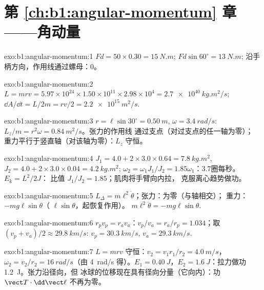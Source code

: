 \section*{第 \ref{ch:b1:angular-momentum} 章——角动量}

\begin{solution}{exo:b1:angular-momentum:1}
$Fd = 50 \times 0.30 = \qty{15}{N.m}$; $Fd\sin 60^\circ = \qty{13}{N.m}$;
沿手柄方向，作用线通过螺母：$0$。
\end{solution}

\begin{solution}{exo:b1:angular-momentum:2}
$L = mrv = 5.97\times10^{24} \times 1.50\times10^{11} \times 2.98\times10^4 =
\qty{2.7e40}{kg.m^2/s}$; $\dd A/\dd t = L/2m = rv/2 = \qty{2.2e15}{m^2/s}$.
\end{solution}

\begin{solution}{exo:b1:angular-momentum:3}
$r = \ell\sin 30^\circ = \qty{0.50}{m}$, $\omega = \qty{3.4}{rad/s}$:
$L_z/m = r^2\omega = \qty{0.84}{m^2/s}$。张力的作用线
通过支点（对过支点的任一轴为零）；
重力平行于竖直轴（对该轴为零）：$L_z$
守恒。
\end{solution}

\begin{solution}{exo:b1:angular-momentum:4}
$J_1 = 4.0 + 2 \times 3.0 \times 0.64 = \qty{7.8}{kg.m^2}$, $J_2 = 4.0 +
2 \times 3.0 \times 0.04 = \qty{4.2}{kg.m^2}$; $\omega_2 = \omega_1J_1/J_2 =
1.85\omega_1$：\qty{3.7}{}圈每秒。$E_k = L^2/2J$：
比值 $J_1/J_2 = 1.85$；肌肉将手臂向内拉，
克服离心趋势做功。
\end{solution}

\begin{solution}{exo:b1:angular-momentum:5}
$L_\Delta = m\ell^2\dot\theta$；张力：为零（与轴相交）；
重力：$-mg\ell\sin\theta$（ $\ell\sin\theta$，起恢复作用）。
$m\ell^2\ddot\theta = -mg\ell\sin\theta$.
\end{solution}

\begin{solution}{exo:b1:angular-momentum:6}
$r_pv_p = r_av_a$：$v_p/v_a = r_a/r_p = 1.034$；取 $(v_p + v_a)/2 \approx
\qty{29.8}{km/s}$: $v_p = \qty{30.3}{km/s}$, $v_a = \qty{29.3}{km/s}$.
\end{solution}

\begin{solution}{exo:b1:angular-momentum:7}
$L = mrv$ 守恒：$v_2 = v_1r_1/r_2 = \qty{4.0}{m/s}$，$\omega_2 = v_2/r_2
= \qty{16}{rad/s}$（由 \qty{4}{rad/s} 得）。$E_1 = \qty{0.40}{J}$，$E_2 =
\qty{1.6}{J}$：拉力做功 \qty{1.2}{J}。张力沿径向，但
冰球的位移现在具有径向分量（它向内）：功
$\vect T\cdot\dd\vect\ell$ 不再为零。
\end{solution}

